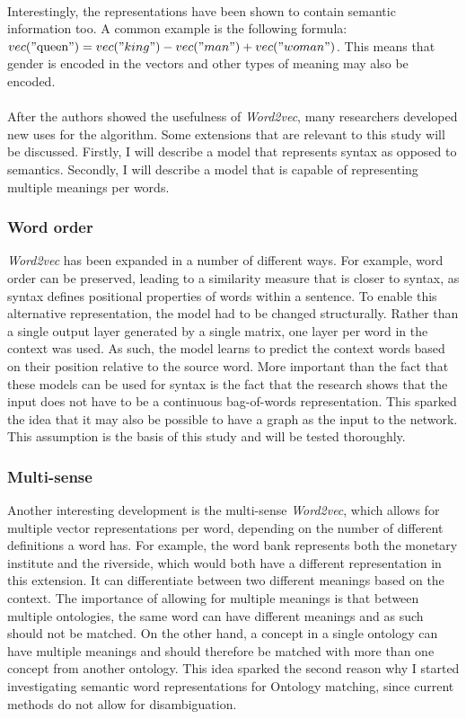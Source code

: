 \documentclass{article}
\begin{document}
 \paragraph{}
 Interestingly, the representations have been shown to contain semantic information too. A common example is the following formula: $vec("\text{queen}") = vec("king") - vec("man") + vec("woman")$. This means that gender is encoded in the vectors and other types of meaning may also be encoded.
 \paragraph{}
 After the authors showed the usefulness of \emph{Word2vec}, many researchers developed new uses for the algorithm. Some extensions that are relevant to this study will be discussed. Firstly, I will describe a model that represents syntax as opposed to semantics. Secondly, I will describe a model that is capable of representing multiple meanings per words.
 
 \subsubsection{Word order} \label{wordorder}
 \emph{Word2vec} has been expanded in a number of different ways. For example, word order can be preserved, leading to a similarity measure that is closer to syntax, as syntax defines positional properties of words within a sentence\cite{ling2015}. To enable this alternative representation, the model had to be changed structurally. Rather than a single output layer generated by a single matrix, one layer per word in the context was used. As such, the model learns to predict the context words based on their position relative to the source word. More important than the fact that these models can be used for syntax is the fact that the research shows that the input does not have to be a continuous bag-of-words representation. This sparked the idea that it may also be possible to have a graph as the input to the network. This assumption is the basis of this study and will be tested thoroughly.
 
 \subsubsection{Multi-sense} \label{multisense}
 Another interesting development is the multi-sense \emph{Word2vec}, which allows for multiple vector representations per word, depending on the number of different definitions a word has. For example, the word bank represents both the monetary institute and the riverside, which would both have a different representation in this extension. It can differentiate between two different meanings based on the context. The importance of allowing for multiple meanings is that between multiple ontologies, the same word can have different meanings and as such should not be matched. On the other hand, a concept in a single ontology can have multiple meanings and should therefore be matched with more than one concept from another ontology\cite{multisense}. This idea sparked the second reason why I started investigating semantic word representations for Ontology matching, since current methods do not allow for disambiguation.
\end{document}
